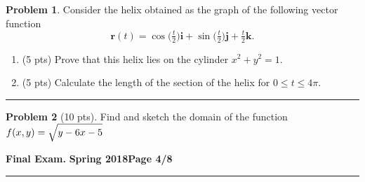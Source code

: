 \documentclass[12pt]{article}
\theoremstyle{definition}
\newtheorem{problem}{Problem}
\begin{document}
\bigskip
\begin{problem}
Consider the helix obtained as the graph of the following vector function 
\begin{equation*}
\boldsymbol{r}(t) = \cos \big(\tfrac{t}{2}\big) \boldsymbol{i} + \sin \big( \tfrac{t}{2} \big) \boldsymbol{j} +\tfrac{t}{2} \boldsymbol{k}.
\end{equation*}
\begin{enumerate}
  \item (5 pts) Prove that this helix lies on the cylinder $x^2+y^2=1$.
  \vspace{3cm}
  \item (5 pts) Calculate the length of the section of the helix for $0 \leq t \leq 4\pi$.
  \vspace{4cm}
  \begin{flushright}
  \end{flushright}
\end{enumerate}
\end{problem}
\hrule
\begin{problem}[10 pts]
Find and sketch the domain of the function $f(x,y) = \sqrt{\strut y-6x-5}$

\vspace{1cm}
\vspace{1cm}  
\begin{flushright}
\end{flushright}
\end{problem}
\newpage

\hfill{\large\bf Final Exam.}\hfill{\large\bf
  Spring 2018}\hfill{\large\bf Page 4/8}\hrule
\end{document}
